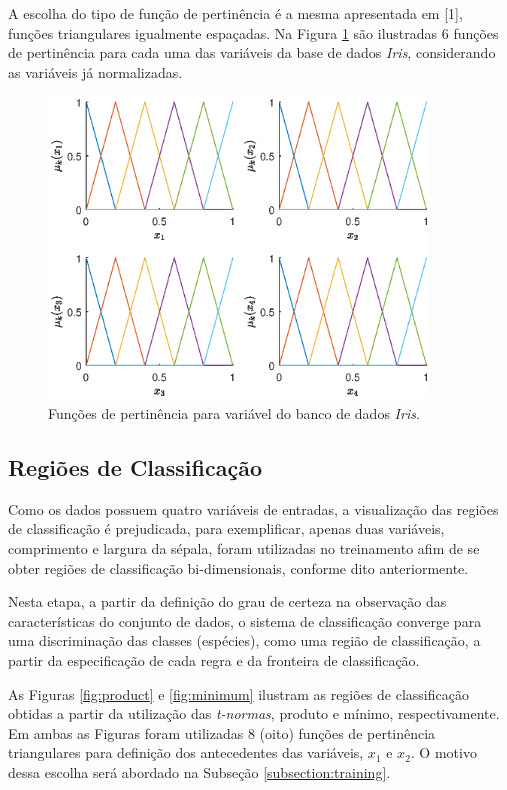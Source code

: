 \documentclass[12pt,a4paper]{article}
\numberwithin{equation}{section}
\begin{document}
A escolha do tipo de função de pertinência é a mesma apresentada em [1], funções triangulares igualmente espaçadas. Na Figura \ref{fig:membership} são ilustradas $6$ funções de pertinência para cada uma das variáveis da base de dados \textit{Iris}, considerando as variáveis já normalizadas.

\begin{figure}[ht!]
\centering
\includegraphics[width=0.9\textwidth]{figures/membership.eps}
\caption{Funções de pertinência para variável do banco de dados \textit{Iris}.}
\label{fig:membership}
\end{figure}

\subsection{Regiões de Classificação}

Como os dados possuem quatro variáveis de entradas, a visualização das regiões de classificação é prejudicada, para exemplificar, apenas duas variáveis, comprimento e largura da sépala, foram utilizadas no treinamento afim de se obter regiões de classificação bi-dimensionais, conforme dito anteriormente.

Nesta etapa, a partir da definição do grau de certeza na observação das características do conjunto de dados, o sistema de classificação converge para uma discriminação das classes (espécies), como uma região de classificação, a partir da especificação de cada regra e da fronteira de classificação.

As Figuras \ref{fig:product} e \ref{fig:minimum} ilustram as regiões de classificação obtidas a partir da utilização das \textit{t-normas}, produto e mínimo, respectivamente. Em ambas as Figuras foram utilizadas $8$ (oito) funções de pertinência triangulares para definição dos antecedentes das variáveis, $x_1$ e $x_2$. O motivo dessa escolha será abordado na Subseção \ref{subsection:training}.
\end{document}
